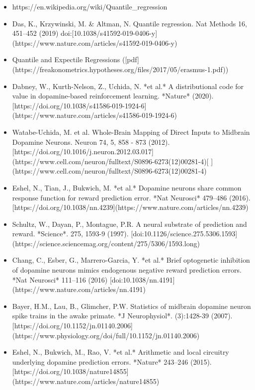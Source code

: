 \begin{itemize}
\item https://en.wikipedia.org/wiki/Quantile_regression
\item Das, K., Krzywinski, M. & Altman, N. Quantile regression. Nat Methods 16, 451–452 (2019) doi:[10.1038/s41592-019-0406-y](https://www.nature.com/articles/s41592-019-0406-y)
\item Quantile and Expectile Regressions ([pdf](https://freakonometrics.hypotheses.org/files/2017/05/erasmus-1.pdf))
\item Dabney, W., Kurth-Nelson, Z., Uchida, N. *et al.* A distributional code for value in dopamine-based reinforcement learning. *Nature* (2020). [https://doi.org/10.1038/s41586-019-1924-6](https://www.nature.com/articles/s41586-019-1924-6)
\item Watabe-Uchida, M. et al. Whole-Brain Mapping of Direct Inputs to Midbrain Dopamine Neurons. Neuron 74, 5, 858 - 873 (2012). [https://doi.org/10.1016/j.neuron.2012.03.017](https://www.cell.com/neuron/fulltext/S0896-6273(12)00281-4)[ ](https://www.cell.com/neuron/fulltext/S0896-6273(12)00281-4)
\item Eshel, N., Tian, J., Bukwich, M. *et al.* Dopamine neurons share common response function for reward prediction error. *Nat Neurosci* \textbf{} 479–486 (2016). [https://doi.org/10.1038/nn.4239](https://www.nature.com/articles/nn.4239)
\item Schultz, W., Dayan, P., Montague, P.R. A neural substrate of prediction and reward. *Science*. 275, 1593-9 (1997). [doi:10.1126/science.275.5306.1593](https://science.sciencemag.org/content/275/5306/1593.long)
\item Chang, C., Esber, G., Marrero-Garcia, Y. *et al.* Brief optogenetic inhibition of dopamine neurons mimics endogenous negative reward prediction errors. *Nat Neurosci* \textbf{} 111–116 (2016) [doi:10.1038/nn.4191](https://www.nature.com/articles/nn.4191)  
\item Bayer, H.M., Lau, B., Glimcher, P.W. Statistics of midbrain dopamine neuron spike trains in the awake primate. *J Neurophysiol*. \textbf{}(3):1428-39 (2007). [https://doi.org/10.1152/jn.01140.2006](https://www.physiology.org/doi/full/10.1152/jn.01140.2006)
\item Eshel, N., Bukwich, M., Rao, V. *et al.* Arithmetic and local circuitry underlying dopamine prediction errors. *Nature* \textbf{} 243–246 (2015). [https://doi.org/10.1038/nature14855](https://www.nature.com/articles/nature14855)
\end{itemize}
